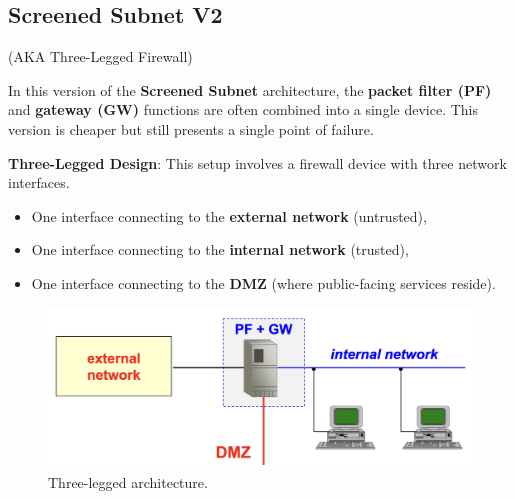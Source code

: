 \subsection{Screened Subnet V2}
\begin{center}
    (AKA Three-Legged Firewall)
\end{center}

\noindent In this version of the \textbf{Screened Subnet} architecture, the \textbf{packet filter (PF)} and \textbf{gateway (GW)} functions are often combined into a single device. This version is cheaper but still presents a single point of failure.

\hfill 

\noindent\textbf{Three-Legged Design}: This setup involves a firewall device with three network interfaces.
\begin{itemize}
    \item One interface connecting to the \textbf{external network} (untrusted),
    \item One interface connecting to the \textbf{internal network} (trusted),
    \item One interface connecting to the \textbf{DMZ} (where public-facing services reside).
\end{itemize}

\begin{figure}[H]
    \centering
    \includegraphics[width=0.5\linewidth]{Images/Firewalling/screened_subnet_v2.png}
    \caption{Three-legged architecture.}
\end{figure}

